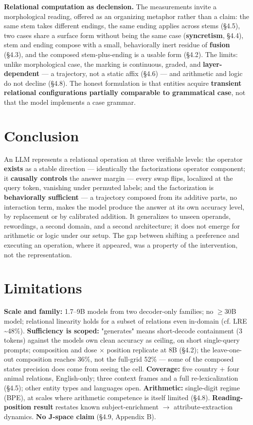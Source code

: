\textbf{Relational computation as declension.} The measurements invite a
morphological reading, offered as an organizing metaphor rather than a
claim: the same stem takes different endings, the same ending applies
across stems (\S{}4.5), two cases share a surface form without being the
same case (\textbf{syncretism}, \S{}4.4), stem and ending compose with a
small, behaviorally inert residue of \textbf{fusion} (\S{}4.3), and the
composed stem-plus-ending is a usable form (\S{}4.2). The limits: unlike
morphological case, the marking is continuous, graded, and
\textbf{layer-dependent} --- a trajectory, not a static affix (\S{}4.6) ---
and arithmetic and logic do not decline (\S{}4.8). The honest formulation
is that entities acquire \textbf{transient relational configurations
partially comparable to grammatical case}, not that the model implements
a case grammar.

\section{Conclusion}

An LLM represents a relational operation at three verifiable levels: the
operator \textbf{exists} as a stable direction --- identically the
factorization\textquotesingle s operator component; it \textbf{causally
controls} the answer margin --- every swap flips, localized at the query
token, vanishing under permuted labels; and the factorization is
\textbf{behaviorally sufficient} --- a trajectory composed from its
additive parts, no interaction term, makes the model produce the answer
at its own accuracy level, by replacement or by calibrated addition. It
generalizes to unseen operands, rewordings, a second domain, and a
second architecture; it does not emerge for arithmetic or logic under
our setup. The gap between shifting a preference and executing an
operation, where it appeared, was a property of the intervention, not
the representation.

\section{Limitations}

\textbf{Scale and family:} 1.7--9B models from two decoder-only
families; no \ensuremath{\geq}30B model; relational linearity holds for a subset of
relations even in-domain (cf. LRE \textasciitilde48\%).
\textbf{Sufficiency is scoped:} "generates" means short-decode
containment (3 tokens) against the model\textquotesingle s own clean
accuracy as ceiling, on short single-query prompts; composition and dose
\ensuremath{\times} position replicate at 8B (\S{}4.2); the leave-one-out composition reaches
36\%, not the full-grid 52\% --- some of the composed
state\textquotesingle s precision does come from seeing the cell.
\textbf{Coverage:} five country + four animal relations, English-only;
three context frames and a full re-lexicalization (\S{}4.5); other entity
types and languages open. \textbf{Arithmetic:} single-digit regime
(BPE), at scales where arithmetic competence is itself limited (\S{}4.8).
\textbf{Reading-position result} restates known subject-enrichment \ensuremath{\to}
attribute-extraction dynamics. \textbf{No J-space claim} (\S{}4.9, Appendix
B).

